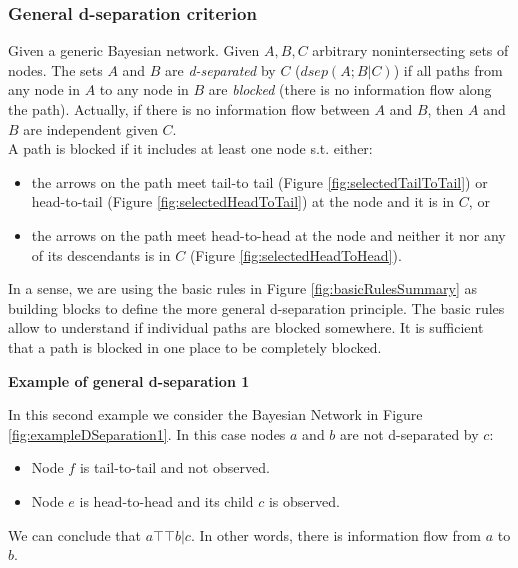 \subsubsection{General d-separation criterion}
Given a generic Bayesian network. Given $A,B,C$ arbitrary nonintersecting sets of nodes. The sets $A$ and $B$ are \textit{d-separated} by $C$ ($\mathit{dsep}(A;B|C)$) if all paths from any node in $A$ to any node in $B$ are \textit{blocked} (there is no information flow along the path). Actually, if there is no information flow between $A$ and $B$, then $A$ and $B$ are independent given $C$.\\
A path is blocked if it includes at least one node s.t. either:
\begin{itemize}
    \item the arrows on the path meet tail-to tail (Figure \ref{fig:selectedTailToTail}) or head-to-tail (Figure \ref{fig:selectedHeadToTail}) at the node and it is in $C$, or
    \item the arrows on the path meet head-to-head at the node and neither it nor any of its descendants is in $C$ (Figure \ref{fig:selectedHeadToHead}).
\end{itemize}


In a sense, we are using the basic rules in Figure \ref{fig:basicRulesSummary} as building blocks to define the more general d-separation principle. The basic rules allow to understand if individual paths are blocked somewhere. It is sufficient that a path is blocked in one place to be completely blocked. \newline

\textbf{Example of general d-separation 1}

In this second example we consider the Bayesian Network in Figure \ref{fig:exampleDSeparation1}. In this case nodes $a$ and $b$ are not d-separated by $c$:
\begin{itemize}
    \item Node $f$ is tail-to-tail and not observed.
    \item Node $e$ is head-to-head and its child $c$ is observed.
\end{itemize}

We can conclude that $a \top\!\!\!\!\top b | c$. In other words, there is information flow from $a$ to $b$. \newline

